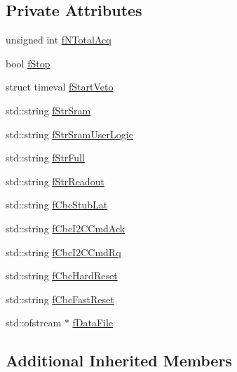\subsection*{Private Attributes}
\begin{DoxyCompactItemize}
\item 
unsigned int \hyperlink{class_ph2___hw_interface_1_1_glib_interface_a1b8fe11933c22b5c97e23ad2c4e4407c}{f\-N\-Total\-Acq}
\item 
bool \hyperlink{class_ph2___hw_interface_1_1_glib_interface_a0cc29dcdff019e8b11ea8ebab631159e}{f\-Stop}
\item 
struct timeval \hyperlink{class_ph2___hw_interface_1_1_glib_interface_a056c3192477cbd07c67ff822bc7123de}{f\-Start\-Veto}
\item 
std\-::string \hyperlink{class_ph2___hw_interface_1_1_glib_interface_a9e24a95e6ba16076ef8fbea1c96243f4}{f\-Str\-Sram}
\item 
std\-::string \hyperlink{class_ph2___hw_interface_1_1_glib_interface_a27b44db1be7f8a3802ba1a5d675a9888}{f\-Str\-Sram\-User\-Logic}
\item 
std\-::string \hyperlink{class_ph2___hw_interface_1_1_glib_interface_a40299b584632b402f3c54fc9d98d87f2}{f\-Str\-Full}
\item 
std\-::string \hyperlink{class_ph2___hw_interface_1_1_glib_interface_a925d65d022d0dc6d453e0e611826c377}{f\-Str\-Readout}
\item 
std\-::string \hyperlink{class_ph2___hw_interface_1_1_glib_interface_aa72b2c10537eb001fe5bd7ee611b2d57}{f\-Cbc\-Stub\-Lat}
\item 
std\-::string \hyperlink{class_ph2___hw_interface_1_1_glib_interface_ae9ec903a2dd264ad800292d7c3aa3d2b}{f\-Cbc\-I2\-C\-Cmd\-Ack}
\item 
std\-::string \hyperlink{class_ph2___hw_interface_1_1_glib_interface_a413443d88da98de71c5fcfa998ea89b5}{f\-Cbc\-I2\-C\-Cmd\-Rq}
\item 
std\-::string \hyperlink{class_ph2___hw_interface_1_1_glib_interface_a3c87ad019e3df02833d10cf653b4e1eb}{f\-Cbc\-Hard\-Reset}
\item 
std\-::string \hyperlink{class_ph2___hw_interface_1_1_glib_interface_a3f6d3aec340c12329fe26242de9b9577}{f\-Cbc\-Fast\-Reset}
\item 
std\-::ofstream $\ast$ \hyperlink{class_ph2___hw_interface_1_1_glib_interface_a6efc2da55aafca870e1259e78436e1ef}{f\-Data\-File}
\end{DoxyCompactItemize}
\subsection*{Additional Inherited Members}


